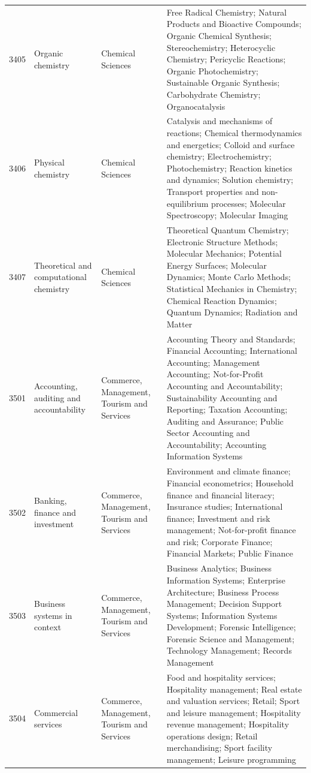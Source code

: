 \begin{longtable}{r p{2.45cm} p{2.55cm} p{6.15cm}}
3405 & Organic chemistry & Chemical Sciences & Free Radical Chemistry; Natural Products and Bioactive Compounds; Organic Chemical Synthesis; Stereochemistry; Heterocyclic Chemistry; Pericyclic Reactions; Organic Photochemistry; Sustainable Organic Synthesis; Carbohydrate Chemistry; Organocatalysis \\
3406 & Physical chemistry & Chemical Sciences & Catalysis and mechanisms of reactions; Chemical thermodynamics and energetics; Colloid and surface chemistry; Electrochemistry; Photochemistry; Reaction kinetics and dynamics; Solution chemistry; Transport properties and non-equilibrium processes; Molecular Spectroscopy; Molecular Imaging \\
3407 & Theoretical and computational chemistry & Chemical Sciences & Theoretical Quantum Chemistry; Electronic Structure Methods; Molecular Mechanics; Potential Energy Surfaces; Molecular Dynamics; Monte Carlo Methods; Statistical Mechanics in Chemistry; Chemical Reaction Dynamics; Quantum Dynamics; Radiation and Matter \\
3501 & Accounting, auditing and accountability & Commerce, Management, Tourism and Services & Accounting Theory and Standards; Financial Accounting; International Accounting; Management Accounting; Not-for-Profit Accounting and Accountability; Sustainability Accounting and Reporting; Taxation Accounting; Auditing and Assurance; Public Sector Accounting and Accountability; Accounting Information Systems \\
3502 & Banking, finance and investment & Commerce, Management, Tourism and Services & Environment and climate finance; Financial econometrics; Household finance and financial literacy; Insurance studies; International finance; Investment and risk management; Not-for-profit finance and risk; Corporate Finance; Financial Markets; Public Finance \\
3503 & Business systems in context & Commerce, Management, Tourism and Services & Business Analytics; Business Information Systems; Enterprise Architecture; Business Process Management; Decision Support Systems; Information Systems Development; Forensic Intelligence; Forensic Science and Management; Technology Management; Records Management \\
3504 & Commercial services & Commerce, Management, Tourism and Services & Food and hospitality services; Hospitality management; Real estate and valuation services; Retail; Sport and leisure management; Hospitality revenue management; Hospitality operations design; Retail merchandising; Sport facility management; Leisure programming \\

\end{longtable}

